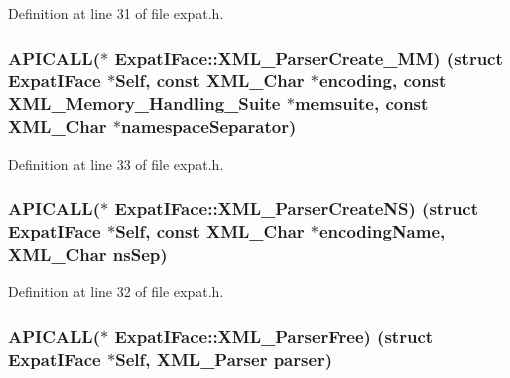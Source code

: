 Definition at line 31 of file expat.\+h.

\subsubsection[{\texorpdfstring{X\+M\+L\+\_\+\+Parser\+Create\+\_\+\+MM}{XML_ParserCreate_MM}}]{ A\+P\+I\+C\+A\+LL($\ast$ Expat\+I\+Face\+::\+X\+M\+L\+\_\+\+Parser\+Create\+\_\+\+MM) (struct {\bf Expat\+I\+Face} $\ast$Self, {\bf const} {\bf X\+M\+L\+\_\+\+Char} $\ast${\bf encoding}, {\bf const} {\bf X\+M\+L\+\_\+\+Memory\+\_\+\+Handling\+\_\+\+Suite} $\ast$memsuite, {\bf const} {\bf X\+M\+L\+\_\+\+Char} $\ast${\bf namespace\+Separator})}\hypertarget{struct_expat_i_face_a59906a3b44e39c5152380ad27283d1c4}{}\label{struct_expat_i_face_a59906a3b44e39c5152380ad27283d1c4}


Definition at line 33 of file expat.\+h.

\subsubsection[{\texorpdfstring{X\+M\+L\+\_\+\+Parser\+Create\+NS}{XML_ParserCreateNS}}]{ A\+P\+I\+C\+A\+LL($\ast$ Expat\+I\+Face\+::\+X\+M\+L\+\_\+\+Parser\+Create\+NS) (struct {\bf Expat\+I\+Face} $\ast$Self, {\bf const} {\bf X\+M\+L\+\_\+\+Char} $\ast$encoding\+Name, {\bf X\+M\+L\+\_\+\+Char} ns\+Sep)}\hypertarget{struct_expat_i_face_ad8936cf154ff1dd85b7b1cf1f2877adf}{}\label{struct_expat_i_face_ad8936cf154ff1dd85b7b1cf1f2877adf}


Definition at line 32 of file expat.\+h.

\subsubsection[{\texorpdfstring{X\+M\+L\+\_\+\+Parser\+Free}{XML_ParserFree}}]{ A\+P\+I\+C\+A\+LL($\ast$ Expat\+I\+Face\+::\+X\+M\+L\+\_\+\+Parser\+Free) (struct {\bf Expat\+I\+Face} $\ast$Self, {\bf X\+M\+L\+\_\+\+Parser} parser)}\hypertarget{struct_expat_i_face_aba158038fa80e4639cf5cef7409347a9}{}\label{struct_expat_i_face_aba158038fa80e4639cf5cef7409347a9}


